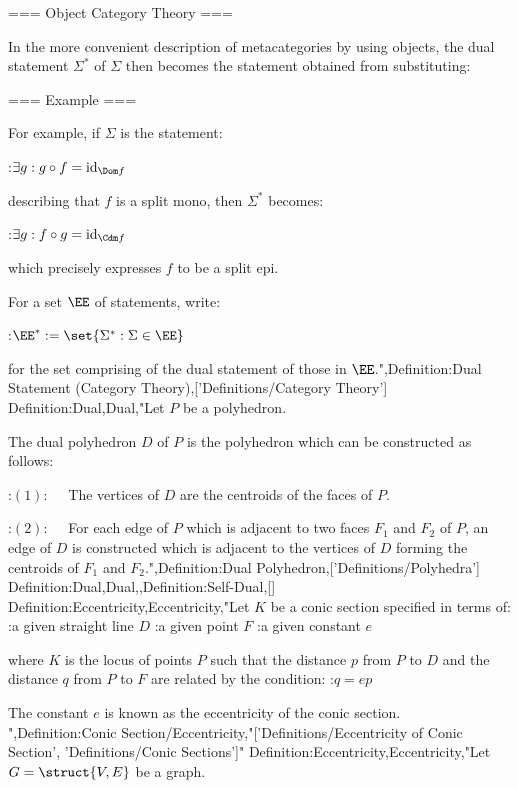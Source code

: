 === Object Category Theory ===

In the more convenient description of metacategories by using objects, the dual statement $\Sigma^*$ of $\Sigma$ then becomes the statement obtained from substituting:









=== Example ===

For example, if $\Sigma$ is the statement:

:$\exists g: g \circ f = \operatorname{id}_{\Dom f}$

describing that $f$ is a split mono, then $\Sigma^*$ becomes:

:$\exists g: f \circ g = \operatorname{id}_{\Cdm f}$

which precisely expresses $f$ to be a split epi.


For a set $\EE$ of statements, write:

:$\EE^* := \set {\Sigma^*: \Sigma \in \EE}$ 

for the set comprising of the dual statement of those in $\EE$.",Definition:Dual Statement (Category Theory),['Definitions/Category Theory']
Definition:Dual,Dual,"Let $P$ be a polyhedron.

The dual polyhedron $D$ of $P$ is the polyhedron which can be constructed as follows:

:$(1): \quad$ The vertices of $D$ are the centroids of the faces of $P$.

:$(2): \quad$ For each edge of $P$ which is adjacent to two faces $F_1$ and $F_2$ of $P$, an edge of $D$ is constructed which is adjacent to the vertices of $D$ forming the centroids of $F_1$ and $F_2$.",Definition:Dual Polyhedron,['Definitions/Polyhedra']
Definition:Dual,Dual,,Definition:Self-Dual,[]
Definition:Eccentricity,Eccentricity,"Let $K$ be a conic section specified in terms of:
:a given straight line $D$
:a given point $F$
:a given constant $e$

where $K$ is the locus of points $P$ such that the distance $p$ from $P$ to $D$ and the distance $q$ from $P$ to $F$ are related by the condition:
:$q = e p$


The constant $e$ is known as the eccentricity of the conic section.
",Definition:Conic Section/Eccentricity,"['Definitions/Eccentricity of Conic Section', 'Definitions/Conic Sections']"
Definition:Eccentricity,Eccentricity,"Let $G = \struct {V, E}$ be a graph.

